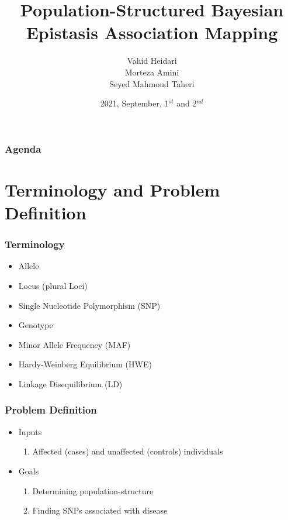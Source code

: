 \documentclass[xcolor=dvipsnames, professionalfont]{beamer}
\title[Structured BEAM]{
	Population-Structured Bayesian Epistasis Association Mapping
}
\author[Heidari \and Amini \and Taheri]{
	Vahid Heidari\\
	Morteza Amini\\
	Seyed Mahmoud Taheri
}
\institute[UT]{
	Group of Algorithms and Computations\\
	University of Tehran
}
\date[2021/09/1$^{st}$-2$^{nd}$]{2021, September, 1$^{st}$ and 2$^{nd}$}
\begin{document}
\begin{frame}
\titlepage
\end{frame}



\begin{frame}
\frametitle{Agenda}
\tableofcontents
\end{frame}



\section{Terminology and Problem Definition}
\begin{frame}
\frametitle{Terminology}
\begin{itemize}
\item Allele \pause
\item Locus (plural Loci) \pause
\item Single Nucleotide Polymorphism (SNP) \pause
\item Genotype \pause
\item Minor Allele Frequency (MAF) \pause
\item Hardy-Weinberg Equilibrium (HWE) \pause
\item Linkage Disequilibrium (LD)
\end{itemize}
\end{frame}

\begin{frame}
\frametitle{Problem Definition}
\begin{itemize}
\item Inputs
	\begin{enumerate}
	\item Affected (cases) and unaffected (controls) individuals
	\end{enumerate} \pause
%
\item Goals
	\begin{enumerate}
	\item Determining population-structure
	\item Finding SNPs associated with disease
	\end{enumerate}
\end{itemize}
\end{frame}
\end{document}
